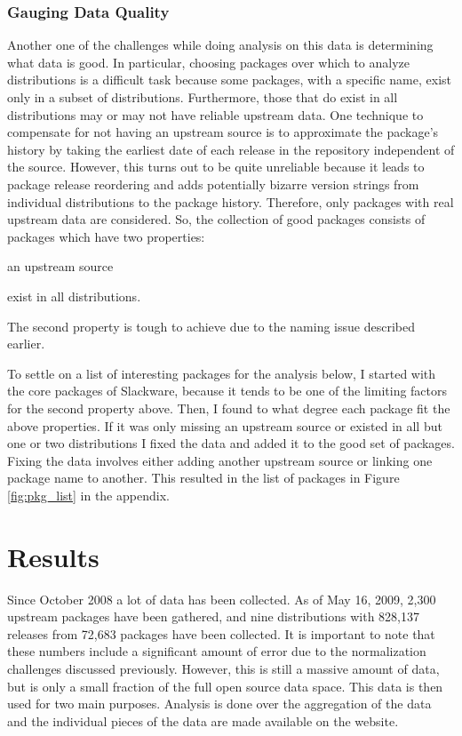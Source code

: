 \documentclass[letterpaper,10pt]{article}
\begin{document}
\subsubsection{Gauging Data Quality}
\label{sec:quality}
Another one of the challenges while doing analysis on this data is determining what data is good.  In particular, choosing packages over which to analyze distributions is a difficult task because some packages, with a specific name, exist only in a subset of distributions.  Furthermore, those that do exist in all distributions may or may not have reliable upstream data.  One technique to compensate for not having an upstream source is to approximate the package's history by taking the earliest date of each release in the repository independent of the source.  However, this turns out to be quite unreliable because it leads to package release reordering and adds potentially bizarre version strings from individual distributions to the package history.  Therefore, only packages with real upstream data are considered.  So, the collection of good packages consists of packages which have two properties: \begin{inparaenum}[\itshape 1\upshape)]
\item an upstream source
\item exist in all distributions.
\end{inparaenum}  The second property is tough to achieve due to the naming issue described earlier.

To settle on a list of interesting packages for the analysis below, I started with the core packages of Slackware, because it tends to be one of the limiting factors for the second property above.  Then, I found to what degree each package fit the above properties.  If it was only missing an upstream source or existed in all but one or two distributions I fixed the data and added it to the good set of packages.  Fixing the data involves either adding another upstream source or linking one package name to another.  This resulted in the list of packages in Figure \ref{fig:pkg_list} in the appendix.
\section{Results}
Since October 2008 a lot of data has been collected.  As of May 16, 2009, 2,300 upstream packages have been gathered, and nine distributions with 828,137 releases from 72,683 packages have been collected.  It is important to note that these numbers include a significant amount of error due to the normalization challenges discussed previously.  However, this is still a massive amount of data, but is only a small fraction of the full open source data space.  This data is then used for two main purposes.  Analysis is done over the aggregation of the data and the individual pieces of the data are made available on the website.
\end{document}
